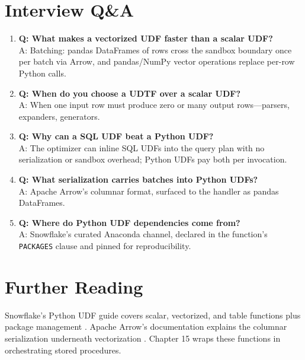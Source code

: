 \section{Interview Q\&A}
\begin{enumerate}
    \item \textbf{Q: What makes a vectorized UDF faster than a scalar UDF?}\\
    A: Batching: pandas DataFrames of rows cross the sandbox boundary once per batch via Arrow, and pandas/NumPy vector operations replace per-row Python calls.
    \item \textbf{Q: When do you choose a UDTF over a scalar UDF?}\\
    A: When one input row must produce zero or many output rows---parsers, expanders, generators.
    \item \textbf{Q: Why can a SQL UDF beat a Python UDF?}\\
    A: The optimizer can inline SQL UDFs into the query plan with no serialization or sandbox overhead; Python UDFs pay both per invocation.
    \item \textbf{Q: What serialization carries batches into Python UDFs?}\\
    A: Apache Arrow's columnar format, surfaced to the handler as pandas DataFrames.
    \item \textbf{Q: Where do Python UDF dependencies come from?}\\
    A: Snowflake's curated Anaconda channel, declared in the function's \texttt{PACKAGES} clause and pinned for reproducibility.
\end{enumerate}

\section{Further Reading}
Snowflake's Python UDF guide covers scalar, vectorized, and table functions plus package management \cite{snowflakeUdfPythonDocs,snowflakeAnacondaDocs}. Apache Arrow's documentation explains the columnar serialization underneath vectorization \cite{arrowDocs}. Chapter 15 wraps these functions in orchestrating stored procedures.

